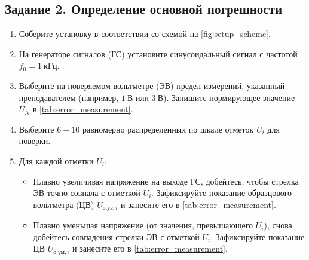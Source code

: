\subsection*{Задание 2. Определение основной погрешности}
\begin{enumerate}
    \item Соберите установку в соответствии со схемой на \cref{fig:setup_scheme}.
    \item На генераторе сигналов (ГС) установите синусоидальный сигнал с частотой $f_0 = 1~\text{кГц}$.
    \item Выберите на поверяемом вольтметре (ЭВ) предел измерений, указанный преподавателем (например, $1~\text{В}$ или $3~\text{В}$). Запишите нормирующее значение $U_N$ в \cref{tab:error_measurement}.
    \item Выберите $6-10$ равномерно распределенных по шкале отметок $U_i$ для поверки.
    \item Для каждой отметки $U_i$:
    \begin{itemize}
        \item Плавно увеличивая напряжение на выходе ГС, добейтесь, чтобы стрелка ЭВ точно совпала с отметкой $U_i$. Зафиксируйте показание образцового вольтметра (ЦВ) $U_{\text{о.ув},i}$ и занесите его в \cref{tab:error_measurement}.
        \item Плавно уменьшая напряжение (от значения, превышающего $U_i$), снова добейтесь совпадения стрелки ЭВ с отметкой $U_i$. Зафиксируйте показание ЦВ $U_{\text{о.ум},i}$ и занесите его в \cref{tab:error_measurement}.
    \end{itemize}
\end{enumerate}

